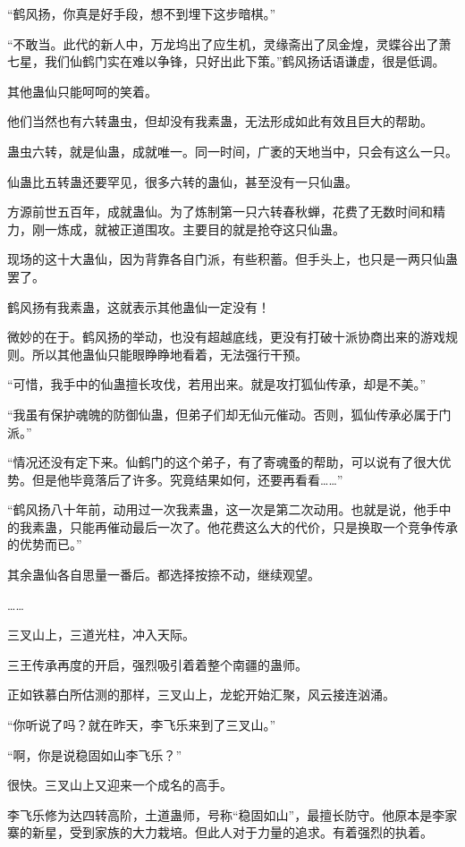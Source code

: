 \begin{this_body}
“鹤风扬，你真是好手段，想不到埋下这步暗棋。”

“不敢当。此代的新人中，万龙坞出了应生机，灵缘斋出了凤金煌，灵蝶谷出了萧七星，我们仙鹤门实在难以争锋，只好出此下策。”鹤风扬话语谦虚，很是低调。

其他蛊仙只能呵呵的笑着。

他们当然也有六转蛊虫，但却没有我素蛊，无法形成如此有效且巨大的帮助。

蛊虫六转，就是仙蛊，成就唯一。同一时间，广袤的天地当中，只会有这么一只。

仙蛊比五转蛊还要罕见，很多六转的蛊仙，甚至没有一只仙蛊。

方源前世五百年，成就蛊仙。为了炼制第一只六转春秋蝉，花费了无数时间和精力，刚一炼成，就被正道围攻。主要目的就是抢夺这只仙蛊。

现场的这十大蛊仙，因为背靠各自门派，有些积蓄。但手头上，也只是一两只仙蛊罢了。

鹤风扬有我素蛊，这就表示其他蛊仙一定没有！

微妙的在于。鹤风扬的举动，也没有超越底线，更没有打破十派协商出来的游戏规则。所以其他蛊仙只能眼睁睁地看着，无法强行干预。

“可惜，我手中的仙蛊擅长攻伐，若用出来。就是攻打狐仙传承，却是不美。”

“我虽有保护魂魄的防御仙蛊，但弟子们却无仙元催动。否则，狐仙传承必属于门派。”

“情况还没有定下来。仙鹤门的这个弟子，有了寄魂蚤的帮助，可以说有了很大优势。但是他毕竟落后了许多。究竟结果如何，还要再看看……”

“鹤风扬八十年前，动用过一次我素蛊，这一次是第二次动用。也就是说，他手中的我素蛊，只能再催动最后一次了。他花费这么大的代价，只是换取一个竞争传承的优势而已。”

其余蛊仙各自思量一番后。都选择按捺不动，继续观望。

……

三叉山上，三道光柱，冲入天际。

三王传承再度的开启，强烈吸引着着整个南疆的蛊师。

正如铁慕白所估测的那样，三叉山上，龙蛇开始汇聚，风云接连汹涌。

“你听说了吗？就在昨天，李飞乐来到了三叉山。”

“啊，你是说稳固如山李飞乐？”

很快。三叉山上又迎来一个成名的高手。

李飞乐修为达四转高阶，土道蛊师，号称“稳固如山”，最擅长防守。他原本是李家寨的新星，受到家族的大力栽培。但此人对于力量的追求。有着强烈的执着。


\end{this_body}
